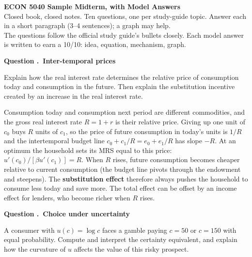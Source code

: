 \documentclass[11pt]{article}
\newcounter{qn}
\newcommand{\question}[1]{\refstepcounter{qn}\par\medskip
{\bfseries\color{ink}Question \theqn.\ #1}\par\smallskip}
\begin{document}
\begin{center}
{\LARGE\bfseries\color{ink} ECON 5040 Sample Midterm, with Model Answers}\\[3pt]
{\small Closed book, closed notes. Ten questions, one per study-guide topic. Answer each in a short paragraph (3--4 sentences); a graph may help.\\
The questions follow the official study guide's bullets closely. Each model answer is written to earn a 10/10: idea, equation, mechanism, graph.}
\end{center}

\question{Inter-temporal prices}
Explain how the real interest rate determines the relative price of consumption today and consumption in the future. Then explain the substitution incentive created by an increase in the real interest rate.

\begin{answer}
\begin{minipage}[t]{0.56\textwidth}\vspace{0pt}
Consumption today and consumption next period are different commodities, and the gross real interest rate $R=1+r$ is their relative price. Giving up one unit of $c_0$ buys $R$ units of $c_1$, so the price of future consumption in today's units is $1/R$ and the intertemporal budget line $c_0+c_1/R=e_0+e_1/R$ has slope $-R$. At an optimum the household sets its MRS equal to this price: $u'(c_0)/[\beta u'(c_1)]=R$. When $R$ rises, future consumption becomes cheaper relative to current consumption (the budget line pivots through the endowment and steepens). The \textbf{substitution effect} therefore always pushes the household to consume less today and save more. The total effect can be offset by an income effect for lenders, who become richer when $R$ rises.
\end{minipage}\hfill
\begin{minipage}[t]{0.4\textwidth}\vspace{0pt}\centering
\figIntertemporal
\end{minipage}
\end{answer}

\question{Choice under uncertainty}
A consumer with $u(c)=\log c$ faces a gamble paying $c=50$ or $c=150$ with equal probability. Compute and interpret the certainty equivalent, and explain how the curvature of $u$ affects the value of this risky prospect.
\end{document}
